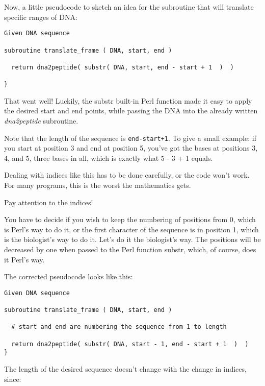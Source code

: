 Now, a little pseudocode to sketch an idea for the subroutine that will translate specific ranges of DNA: 

\begin{lstlisting}
Given DNA sequence

subroutine translate_frame ( DNA, start, end )

  return dna2peptide( substr( DNA, start, end - start + 1  )  )

}
\end{lstlisting}

That went well! Luckily, the substr built-in Perl function made it easy to apply the desired start and end points, while passing the DNA into the already written \textit{dna2peptide} subroutine.

Note that the length of the sequence is \verb|end-start+1|. To give a small example: if you start at position 3 and end at position 5, you've got the bases at positions 3, 4, and 5, three bases in all, which is exactly what 5 - 3 + 1 equals.

Dealing with indices like this has to be done carefully, or the code won't work. For many programs, this is the worst the mathematics gets. 


\begin{adjustwidth}{2cm}{2cm}
Pay attention to the indices!
\end{adjustwidth}

You have to decide if you wish to keep the numbering of positions from 0, which is Perl's way to do it, or the first character of the sequence is in position 1, which is the biologist's way to do it. Let's do it the biologist's way. The positions will be decreased by one when passed to the Perl function substr, which, of course, does it Perl's way.

The corrected pseudocode looks like this:

\begin{lstlisting}
Given DNA sequence

subroutine translate_frame ( DNA, start, end )

  # start and end are numbering the sequence from 1 to length

  return dna2peptide( substr( DNA, start - 1, end - start + 1  )  )
}
\end{lstlisting}

The length of the desired sequence doesn't change with the change in
indices, since:

